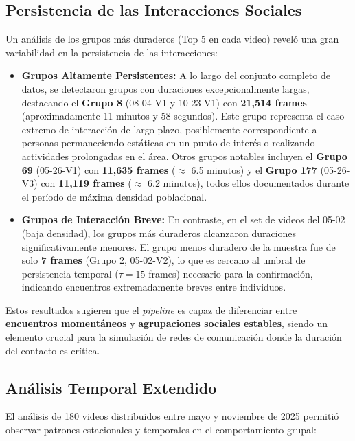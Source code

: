 \subsection{Persistencia de las Interacciones Sociales}
Un análisis de los grupos más duraderos (Top 5 en cada video) reveló una gran variabilidad en la persistencia de las interacciones:

\begin{itemize}
	\item \textbf{Grupos Altamente Persistentes:} A lo largo del conjunto completo de datos, se detectaron grupos con duraciones excepcionalmente largas, destacando el \textbf{Grupo 8} (08-04-V1 y 10-23-V1) con \textbf{21,514 frames} (aproximadamente 11 minutos y 58 segundos). Este grupo representa el caso extremo de interacción de largo plazo, posiblemente correspondiente a personas permaneciendo estáticas en un punto de interés o realizando actividades prolongadas en el área. Otros grupos notables incluyen el \textbf{Grupo 69} (05-26-V1) con \textbf{11,635 frames} ($\approx$ 6.5 minutos) y el \textbf{Grupo 177} (05-26-V3) con \textbf{11,119 frames} ($\approx$ 6.2 minutos), todos ellos documentados durante el período de máxima densidad poblacional.
	
	\item \textbf{Grupos de Interacción Breve:} En contraste, en el set de videos del 05-02 (baja densidad), los grupos más duraderos alcanzaron duraciones significativamente menores. El grupo menos duradero de la muestra fue de solo \textbf{7 frames} (Grupo 2, 05-02-V2), lo que es cercano al umbral de persistencia temporal ($\tau=15$ frames) necesario para la confirmación, indicando encuentros extremadamente breves entre individuos.
\end{itemize}

Estos resultados sugieren que el \textit{pipeline} es capaz de diferenciar entre \textbf{encuentros momentáneos} y \textbf{agrupaciones sociales estables}, siendo un elemento crucial para la simulación de redes de comunicación donde la duración del contacto es crítica.

\subsection{Análisis Temporal Extendido}
El análisis de 180 videos distribuidos entre mayo y noviembre de 2025 permitió observar patrones estacionales y temporales en el comportamiento grupal:

